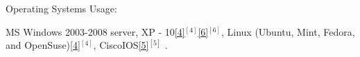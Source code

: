 \begin{cventries}
%    
%    
  \cventry
    {Operating Systems Usage:} %
    {} 
    {} 
    {} 
    {
      \begin{cvitems} %
        \item {
		MS Windows 2003-2008 server, XP - 10\ref{4}{$^{[4]}$}\ref{6}{$^{[6]}$}, 
        Linux (Ubuntu, Mint, Fedora, and OpenSuse)\ref{4}{$^{[4]}$}, 
        CiscoIOS\ref{5}{$^{[5]}$}%
        .} 
      \end{cvitems}
    }  
  \vspace{-0.2cm} 
    



\end{cventries}
